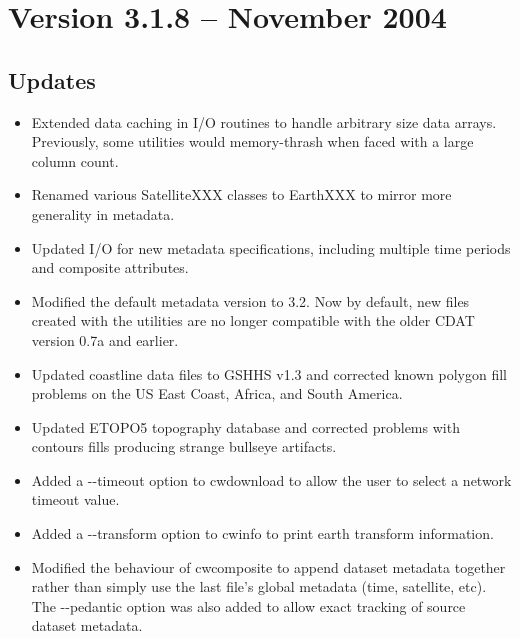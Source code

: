 
\section{Version 3.1.8 -- November 2004}

\subsection*{Updates}
\begin{itemize}

  \item Extended data caching in I/O routines to handle arbitrary size
  data arrays. Previously, some utilities would memory-thrash when
  faced with a large column count.

  \item Renamed various SatelliteXXX classes to EarthXXX to mirror
  more generality in metadata.

  \item Updated I/O for new metadata specifications, including
  multiple time periods and composite attributes.

  \item Modified the default metadata version to 3.2. Now by default,
  new files created with the utilities are no longer compatible with
  the older CDAT version 0.7a and earlier.

  \item Updated coastline data files to GSHHS v1.3 and corrected known
  polygon fill problems on the US East Coast, Africa, and South
  America.

  \item Updated ETOPO5 topography database and corrected problems with
  contours fills producing strange bullseye artifacts.

  \item Added a -{-}timeout option to cwdownload to allow the user to
  select a network timeout value.

  \item Added a -{-}transform option to cwinfo to print earth transform
  information.

  \item Modified the behaviour of cwcomposite to append dataset
  metadata together rather than simply use the last file's global
  metadata (time, satellite, etc). The -{-}pedantic option was also
  added to allow exact tracking of source dataset metadata.


\end{itemize}
